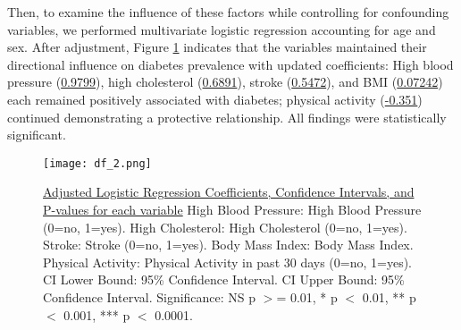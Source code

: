 \documentclass[11pt]{article}
\begin{document}
Then, to examine the influence of these factors while controlling for confounding variables, we performed multivariate logistic regression accounting for age and sex. After adjustment, Figure \ref{figure:Adjusted_Coefficients} indicates that the variables maintained their directional influence on diabetes prevalence with updated coefficients: High blood pressure (\hyperlink{B0a}{0.9799}), high cholesterol (\hyperlink{B1a}{0.6891}), stroke (\hyperlink{B2a}{0.5472}), and BMI (\hyperlink{B3a}{0.07242}) each remained positively associated with diabetes; physical activity (\hyperlink{B4a}{-0.351}) continued demonstrating a protective relationship. All findings were statistically significant.


\begin{figure}[htbp]
\centering
\texttt{[image: df\_2.png]}
\caption{\protect\hyperlink{file-df-2-pkl}{Adjusted Logistic Regression Coefficients, Confidence Intervals, and P-values for each variable}
High Blood Pressure: High Blood Pressure (0=no, 1=yes). 
High Cholesterol: High Cholesterol (0=no, 1=yes). 
Stroke: Stroke (0=no, 1=yes). 
Body Mass Index: Body Mass Index. 
Physical Activity: Physical Activity in past 30 days (0=no, 1=yes). 
CI Lower Bound: 95\% Confidence Interval. 
CI Upper Bound: 95\% Confidence Interval. 
Significance: NS p $>$= 0.01, * p $<$ 0.01, ** p $<$ 0.001, *** p $<$ 0.0001. }
\label{figure:Adjusted_Coefficients}
\end{figure}
% 
\end{document}
